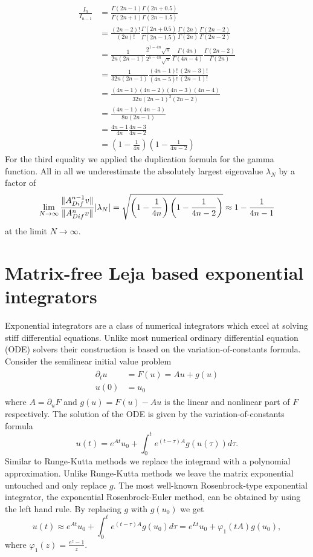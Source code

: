 \documentclass{scrartcl}
\begin{document}
\begin{align*}
\frac{I_n}{I_{n-1}} &= 
\frac{\Gamma(2n - 1)\Gamma(2n + 0.5)}{\Gamma(2n + 1)\Gamma(2n - 1.5)} \\&=   
\frac{(2n - 2)!}{(2n)!}
\frac{\Gamma(2n + 0.5)}{\Gamma(2n - 1.5)}
\frac{\Gamma(2n)}{\Gamma(2n)}
\frac{\Gamma(2n-2)}{\Gamma(2n-2)} \\&=
\frac{1}{2n(2n-1)} 
\frac{2^{1-4n}\sqrt\pi}{2^{5-4n}\sqrt\pi}
\frac{\Gamma(4n)}{\Gamma(4n-4)}
\frac{\Gamma(2n-2)}{\Gamma(2n)} \\&=
\frac{1}{32n(2n-1)} 
\frac{(4n-1)!}{(4n-5)!}
\frac{(2n-3)!}{(2n-1)!} \\&=
\frac{(4n-1)(4n-2)(4n-3)(4n-4)}{32n(2n-1)^2(2n-2)} \\&=
\frac{(4n-1)(4n-3)}{8n(2n-1)} \\&=
\frac{4n-1}{4n}\frac{4n-3}{4n-2} \\&=
\left(1-\frac{1}{4n}\right)\left(1-\frac{1}{4n-2}\right)
\end{align*}
For the third equality we applied the duplication formula for the gamma function. All in all we underestimate the absolutely largest eigenvalue $\lambda_N$ by a factor of 
\[
\lim_{N\to\infty}\frac{\lVert A_{Dif}^{n-1}v\rVert}{\lVert A_{Dif}^{n}v\rVert}\lvert\lambda_N\rvert =
\sqrt{\left(1-\frac{1}{4n}\right)\left(1-\frac{1}{4n-2}\right)} \approx
1-\frac{1}{4n-1}
\]
at the limit $N\to\infty$. 

\section{Matrix-free Leja based exponential integrators}
Exponential integrators are a class of numerical integrators which excel at solving stiff differential equations. Unlike most numerical ordinary differential equation (ODE) solvers their construction is based on the variation-of-constants formula. Consider the semilinear initial value problem
\begin{align}
	\begin{split}
	\partial_tu &= F(u) = Au + g(u) \\ 
	u(0) &= u_0
	\end{split}\label{semilinear}
\end{align}
where $A = \partial_uF$ and $g(u) = F(u)-Au$ is the linear and nonlinear part of $F$ respectively. The solution of the ODE is given by the variation-of-constants formula
\[
u(t) = e^{At}u_0 + \int_{0}^{t}e^{(t-\tau)A}g(u(\tau))d\tau.
\]
Similar to Runge-Kutta methods we replace the integrand with a polynomial approximation. Unlike Runge-Kutta methods we leave the matrix exponential untouched and only replace $g$. The most well-known Rosenbrock-type exponential integrator, the exponential Rosenbrock-Euler method, can be obtained by using the left hand rule. By replacing $g$ with $g(u_0)$ we get
\[
u(t) \approx e^{At}u_0 + \int_{0}^{t}e^{(t-\tau)A}g(u_0)d\tau = e^{Lt}u_0 + \varphi_1(tA)g(u_0),
\]
where $\varphi_1(z) = \frac{e^z-1}z$. 
\end{document}
